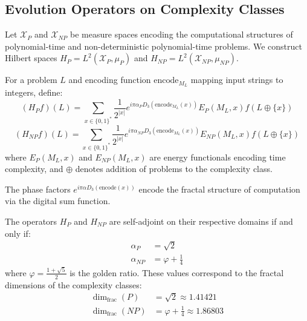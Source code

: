 \subsection{Evolution Operators on Complexity Classes}

Let $\mathcal{X}_P$ and $\mathcal{X}_{NP}$ be measure spaces encoding the computational structures of polynomial-time and non-deterministic polynomial-time problems. We construct Hilbert spaces $H_P = L^2(\mathcal{X}_P, \mu_P)$ and $H_{NP} = L^2(\mathcal{X}_{NP}, \mu_{NP})$.

\begin{definition}
\label{def:comp_operators}
For a problem $L$ and encoding function $\text{encode}_{M_L}$ mapping input strings to integers, define:
\begin{equation}
(H_P f)(L) = \sum_{x \in \{0,1\}^*} \frac{1}{2^{|x|}} e^{i\pi \alpha_P D_3(\text{encode}_{M_L}(x))} E_P(M_L, x) f(L \oplus \{x\})
\end{equation}
\begin{equation}
(H_{NP} f)(L) = \sum_{x \in \{0,1\}^*} \frac{1}{2^{|x|}} e^{i\pi \alpha_{NP} D_3(\text{encode}_{M_L}(x))} E_{NP}(M_L, x) f(L \oplus \{x\})
\end{equation}
where $E_P(M_L, x)$ and $E_{NP}(M_L, x)$ are energy functionals encoding time complexity, and $\oplus$ denotes addition of problems to the complexity class.
\end{definition}

The phase factors $e^{i\pi \alpha D_3(\text{encode}(x))}$ encode the fractal structure of computation via the digital sum function.

\begin{theorem}
\label{thm:self_adjoint_fractal}
The operators $H_P$ and $H_{NP}$ are self-adjoint on their respective domains if and only if:
\begin{align}
\alpha_P &= \sqrt{2} \label{eq:alpha_p} \\
\alpha_{NP} &= \varphi + \frac{1}{4} \label{eq:alpha_np}
\end{align}
where $\varphi = \frac{1 + \sqrt{5}}{2}$ is the golden ratio. These values correspond to the fractal dimensions of the complexity classes:
\begin{align}
\dim_{\text{frac}}(P) &= \sqrt{2} \approx 1.41421 \\
\dim_{\text{frac}}(NP) &= \varphi + \frac{1}{4} \approx 1.86803
\end{align}
\end{theorem}

